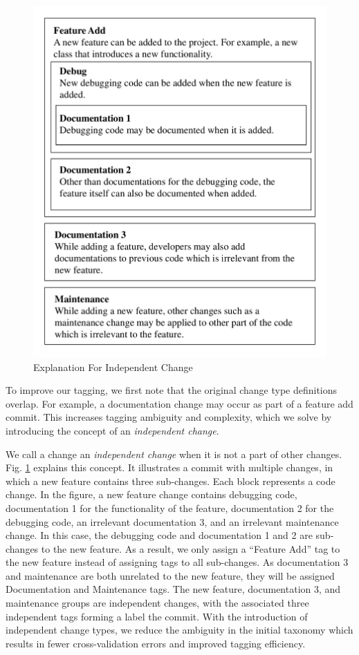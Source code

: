 \begin{figure}[htbp]
\centerline{\includegraphics[scale=0.5]{figures/independent_change.pdf}}
\caption{Explanation For Independent Change}
\label{fig:Relationship}
\end{figure}

To improve our tagging, we first note that the original change type definitions overlap. For example, a documentation change may occur as part of a feature add commit. This increases tagging ambiguity and complexity, which we solve by introducing the concept of an \textit{independent change}.

We call a change an \textit{independent change} when it is not a part of other changes.
Fig. \ref{fig:Relationship} explains this concept. It illustrates a commit with multiple changes, in which a new feature contains three sub-changes.
Each block represents a code change. 
In the figure, a new feature change contains debugging code, documentation 1 for the functionality of the feature, documentation 2 for the debugging code, an irrelevant documentation 3, and an irrelevant maintenance change. 
In this case, the debugging code and documentation 1 and 2 are sub-changes to the new feature. 
As a result, we only assign a ``Feature Add'' tag to the new feature instead of assigning tags to all sub-changes. 
As documentation 3 and maintenance are both unrelated to the new feature, they will be assigned Documentation and Maintenance tags.
The new feature, documentation 3, and maintenance groups are independent changes, with the associated three independent tags forming a label the commit. 
With the introduction of independent change types, we reduce the ambiguity in the initial taxonomy which results in fewer cross-validation errors and improved tagging efficiency.





